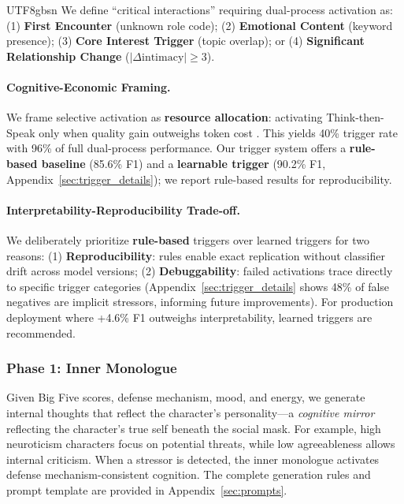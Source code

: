 \documentclass[11pt]{article}
\begin{document}
\begin{CJK*}{UTF8}{gbsn}
We define ``critical interactions'' requiring dual-process activation as: (1) \textbf{First Encounter} (unknown role code); (2) \textbf{Emotional Content} (keyword presence); (3) \textbf{Core Interest Trigger} (topic overlap); or (4) \textbf{Significant Relationship Change} ($|\Delta\text{intimacy}| \geq 3$).

\paragraph{Cognitive-Economic Framing.} We frame selective activation as \textbf{resource allocation}: activating Think-then-Speak only when quality gain outweighs token cost \citep{kahneman2011thinking}. This yields 40\% trigger rate with 96\% of full dual-process performance. Our trigger system offers a \textbf{rule-based baseline} (85.6\% F1) and a \textbf{learnable trigger} (90.2\% F1, Appendix~\ref{sec:trigger_details}); we report rule-based results for reproducibility.

\paragraph{Interpretability-Reproducibility Trade-off.} We deliberately prioritize \textbf{rule-based} triggers over learned triggers for two reasons: (1) \textbf{Reproducibility}: rules enable exact replication without classifier drift across model versions; (2) \textbf{Debuggability}: failed activations trace directly to specific trigger categories (Appendix~\ref{sec:trigger_details} shows 48\% of false negatives are implicit stressors, informing future improvements). For production deployment where +4.6\% F1 outweighs interpretability, learned triggers are recommended.

\subsubsection{Phase 1: Inner Monologue}
\label{sec:inner}

Given Big Five scores, defense mechanism, mood, and energy, we generate internal thoughts that reflect the character's personality---a \textit{cognitive mirror} reflecting the character's true self beneath the social mask. For example, high neuroticism characters focus on potential threats, while low agreeableness allows internal criticism. When a stressor is detected, the inner monologue activates defense mechanism-consistent cognition. The complete generation rules and prompt template are provided in Appendix~\ref{sec:prompts}.


\end{CJK*}
\end{document}
